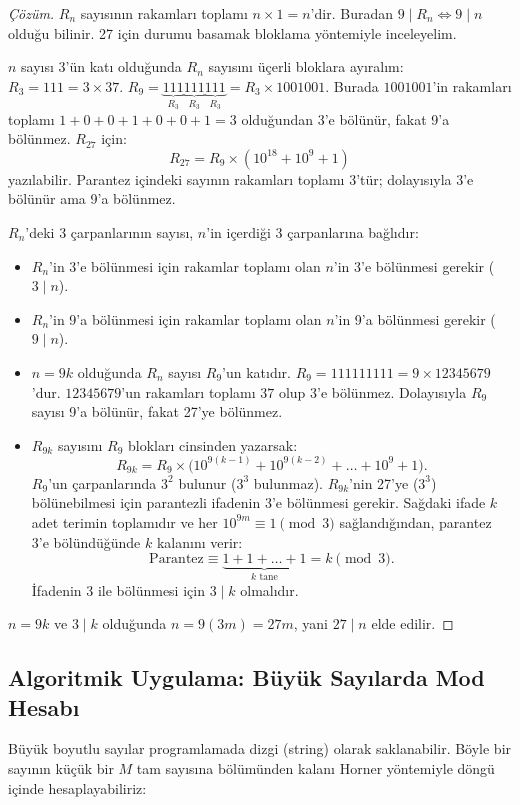 \begin{proof}[Çözüm]
$R_n$ sayısının rakamları toplamı $n \times 1 = n$'dir. Buradan $9 \mid R_n \iff 9 \mid n$ olduğu bilinir. 27 için durumu basamak bloklama yöntemiyle inceleyelim.

$n$ sayısı 3'ün katı olduğunda $R_n$ sayısını üçerli bloklara ayıralım:
$R_3 = 111 = 3 \times 37$.
$R_9 = \underbrace{111}_{R_3} \underbrace{111}_{R_3} \underbrace{111}_{R_3} = R_3 \times 1001001$.
Burada $1001001$'in rakamları toplamı $1+0+0+1+0+0+1 = 3$ olduğundan 3'e bölünür, fakat 9'a bölünmez.
$R_{27}$ için:
\[
R_{27} = R_9 \times (10^{18} + 10^9 + 1)
\]
yazılabilir. Parantez içindeki sayının rakamları toplamı 3'tür; dolayısıyla 3'e bölünür ama 9'a bölünmez.

$R_n$'deki 3 çarpanlarının sayısı, $n$'in içerdiği 3 çarpanlarına bağlıdır:
\begin{itemize}
    \item $R_n$'in 3'e bölünmesi için rakamlar toplamı olan $n$'in 3'e bölünmesi gerekir ($3 \mid n$).
    \item $R_n$'in 9'a bölünmesi için rakamlar toplamı olan $n$'in 9'a bölünmesi gerekir ($9 \mid n$).
    \item $n = 9k$ olduğunda $R_n$ sayısı $R_9$'un katıdır. $R_9 = 111111111 = 9 \times 12345679$'dur. $12345679$'un rakamları toplamı $37$ olup 3'e bölünmez. Dolayısıyla $R_9$ sayısı 9'a bölünür, fakat 27'ye bölünmez.
    \item $R_{9k}$ sayısını $R_9$ blokları cinsinden yazarsak:
    \[
    R_{9k} = R_9 \times \Big( 10^{9(k-1)} + 10^{9(k-2)} + \dots + 10^9 + 1 \Big).
    \]
    $R_9$'un çarpanlarında $3^2$ bulunur ($3^3$ bulunmaz). $R_{9k}$'nin 27'ye ($3^3$) bölünebilmesi için parantezli ifadenin 3'e bölünmesi gerekir. Sağdaki ifade $k$ adet terimin toplamıdır ve her $10^{9m} \equiv 1 \pmod 3$ sağlandığından, parantez 3'e bölündüğünde $k$ kalanını verir:
    \[
    \text{Parantez} \equiv \underbrace{1 + 1 + \dots + 1}_{k \text{ tane}} = k \pmod 3.
    \]
    İfadenin 3 ile bölünmesi için $3 \mid k$ olmalıdır.
\end{itemize}
$n = 9k$ ve $3 \mid k$ olduğunda $n = 9(3m) = 27m$, yani $27 \mid n$ elde edilir.
\end{proof}

\subsection{Algoritmik Uygulama: Büyük Sayılarda Mod Hesabı}

Büyük boyutlu sayılar programlamada dizgi (string) olarak saklanabilir. Böyle bir sayının küçük bir $M$ tam sayısına bölümünden kalanı Horner yöntemiyle döngü içinde hesaplayabiliriz:


